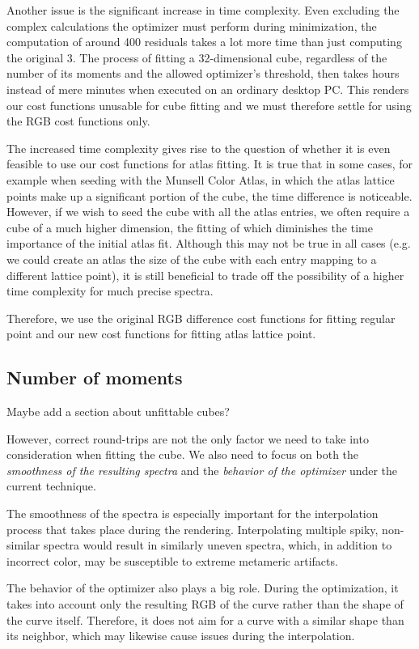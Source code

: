 Another issue is the significant increase in time complexity. Even excluding the complex calculations the optimizer must perform during minimization, the computation of around 400 residuals takes a lot more time than just computing the original 3. The process of fitting a 32-dimensional cube, regardless of the number of its moments and the allowed optimizer's threshold, then takes hours instead of mere minutes when executed on an ordinary desktop PC. This renders our cost functions unusable for cube fitting and we must therefore settle for using the RGB cost functions only.

The increased time complexity gives rise to the question of whether it is even feasible to use our cost functions for atlas fitting. It is true that in some cases, for example when seeding with the Munsell Color Atlas, in which the atlas lattice points make up a significant portion of the cube, the time difference is noticeable. However, if we wish to seed the cube with all the atlas entries, we often require a cube of a much higher dimension, the fitting of which diminishes the time importance of the initial atlas fit. Although this may not be true in all cases (e.g. we could create an atlas the size of the cube with each entry mapping to a different lattice point), it is still beneficial to trade off the possibility of a higher time complexity for much precise spectra.

Therefore, we use the original RGB difference cost functions for fitting regular point and our new cost functions for fitting atlas lattice point.

\subsection{Number of moments}
 
Maybe add a section about unfittable cubes?

However, correct round-trips are not the only factor we need to take into consideration when fitting the cube. We also need to focus on both the \emph{smoothness of the resulting spectra} and the \emph{behavior of the optimizer} under the current technique.

The smoothness of the spectra is especially important for the interpolation process that takes place during the rendering. Interpolating multiple spiky, non-similar spectra would result in similarly uneven spectra, which, in addition to incorrect color, may be susceptible to extreme metameric artifacts.  

The behavior of the optimizer also plays a big role. During the optimization, it takes into account only the resulting RGB of the curve rather than the shape of the curve itself. Therefore, it does not aim for a curve with a similar shape than its neighbor, which may likewise cause issues during the interpolation.

